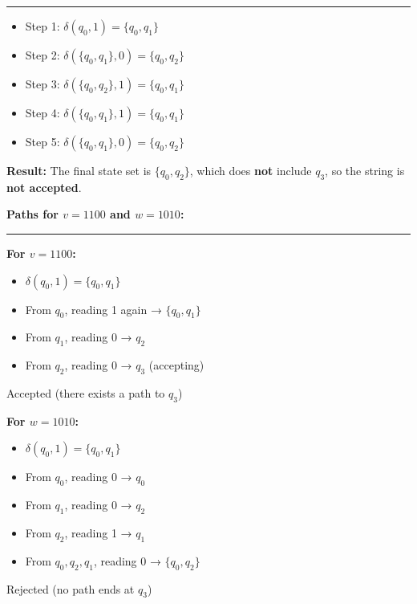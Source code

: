 \documentclass{article}
\theoremstyle{theorem}
\theoremstyle{definition}
\theoremstyle{remark}
\begin{document}
\vspace{0.5em}
\hrule
\vspace{0.5em}

\begin{itemize}
    \item Step 1: \( \delta(q_0, 1) = \{ q_0, q_1 \} \)
    \item Step 2: \( \delta(\{ q_0, q_1 \}, 0) = \{ q_0, q_2 \} \)
    \item Step 3: \( \delta(\{ q_0, q_2 \}, 1) = \{ q_0, q_1 \} \)
    \item Step 4: \( \delta(\{ q_0, q_1 \}, 1) = \{ q_0, q_1 \} \)
    \item Step 5: \( \delta(\{ q_0, q_1 \}, 0) = \{ q_0, q_2 \} \)
\end{itemize}

\textbf{Result:} The final state set is \( \{ q_0, q_2 \} \), which does \textbf{not} include \( q_3 \), so the string is \textbf{not accepted}.

\vspace{1em}
\textbf{Paths for \( v = 1100 \) and \( w = 1010 \):}

\vspace{0.5em}
\hrule
\vspace{0.5em}

\textbf{For \( v = 1100 \):}
\begin{itemize}
    \item \( \delta(q_0, 1) = \{ q_0, q_1 \} \)
    \item From \( q_0 \), reading 1 again → \( \{ q_0, q_1 \} \)
    \item From \( q_1 \), reading 0 → \( q_2 \)
    \item From \( q_2 \), reading 0 → \( q_3 \) (accepting)
\end{itemize}
Accepted (there exists a path to \( q_3 \))

\textbf{For \( w = 1010 \):}
\begin{itemize}
    \item \( \delta(q_0, 1) = \{ q_0, q_1 \} \)
    \item From \( q_0 \), reading 0 → \( q_0 \)
    \item From \( q_1 \), reading 0 → \( q_2 \)
    \item From \( q_2 \), reading 1 → \( q_1 \)
    \item From \( q_0, q_2, q_1 \), reading 0 → \( \{ q_0, q_2 \} \)
\end{itemize}
Rejected (no path ends at \( q_3 \))
\end{document}
